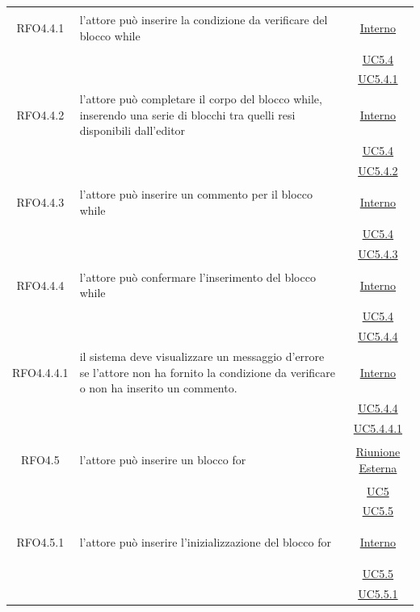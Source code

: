 \begin{longtable}{|c|>{\centering}m{7cm}|c|}
\hypertarget{RFO4.4.1}{RFO4.4.1} & l'attore può inserire la condizione da verificare del blocco while & \hyperlink{Interno}{Interno}\\
& &\hyperref[UC5.4]{UC5.4}\\
& &\hyperref[UC5.4.1]{UC5.4.1}\\ \hline

\hypertarget{RFO4.4.2}{RFO4.4.2} & l'attore può completare il corpo del blocco while, inserendo una serie di blocchi tra quelli resi disponibili dall'editor & \hyperlink{Interno}{Interno}\\
& &\hyperref[UC5.4]{UC5.4}\\
& &\hyperref[UC5.4.2]{UC5.4.2}\\ \hline

\hypertarget{RFO4.4.3}{RFO4.4.3} & l'attore può inserire un commento per il blocco while & \hyperlink{Interno}{Interno}\\
& &\hyperref[UC5.4]{UC5.4}\\
& &\hyperref[UC5.4.3]{UC5.4.3}\\ \hline

\hypertarget{RFO4.4.4}{RFO4.4.4} & l'attore può confermare l'inserimento del blocco while & \hyperlink{Interno}{Interno}\\
& &\hyperref[UC5.4]{UC5.4}\\
& &\hyperref[UC5.4.4]{UC5.4.4}\\ \hline

\hypertarget{RFO4.4.4.1}{RFO4.4.4.1} & il sistema deve visualizzare un messaggio d'errore se l'attore non ha fornito la condizione da verificare o non ha inserito un commento. &\hyperlink{Interno}{Interno}\\
& &\hyperref[UC5.4.4]{UC5.4.4}\\
& &\hyperref[UC5.4.4.1]{UC5.4.4.1}\\ \hline

\hypertarget{RFO4.5}{RFO4.5} & l'attore può inserire un blocco for &  \hyperlink{Riunione Esterna}{Riunione Esterna}\\
& &\hyperref[UC5]{UC5}\\
& &\hyperref[UC5.5]{UC5.5}\\ \hline

\hypertarget{RFO4.5.1}{RFO4.5.1} & l'attore può inserire l'inizializzazione del blocco for & \hyperlink{Interno}{Interno}\\
& &\hyperref[UC5.5]{UC5.5}\\
& &\hyperref[UC5.5.1]{UC5.5.1}\\ \hline


\end{longtable}
